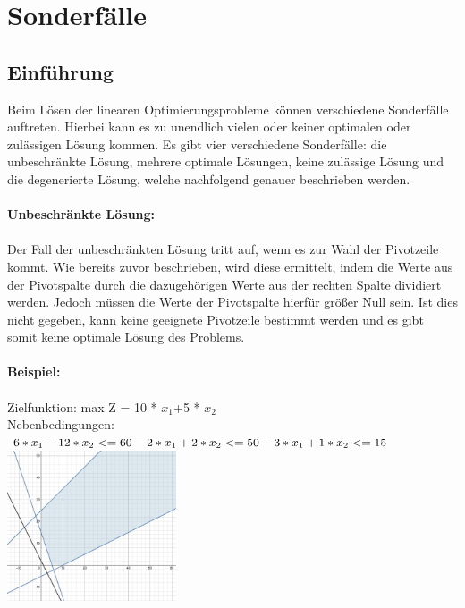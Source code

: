 \section{Sonderfälle}
\subsection{Einführung}
Beim Lösen der linearen Optimierungsprobleme können verschiedene Sonderfälle auftreten. Hierbei kann es zu unendlich vielen oder keiner optimalen oder zulässigen Lösung kommen.
Es gibt vier verschiedene Sonderfälle: die unbeschränkte Lösung, mehrere optimale Lösungen, keine zulässige Lösung und die degenerierte Lösung, welche nachfolgend genauer beschrieben werden.\\\\
\textbf{Unbeschränkte Lösung:}\\\\
Der Fall der unbeschränkten Lösung tritt auf, wenn es zur Wahl der Pivotzeile kommt. Wie bereits zuvor beschrieben, wird diese ermittelt, indem die Werte aus der Pivotspalte durch die dazugehörigen Werte aus der rechten Spalte dividiert werden. Jedoch müssen die Werte der Pivotspalte hierfür größer Null sein. Ist dies nicht gegeben, kann keine geeignete Pivotzeile bestimmt werden und es gibt somit keine optimale Lösung des Problems.
\\\\
\textbf{Beispiel:}\\\\
Zielfunktion: max Z = 10 * $x_1$+5 * $x_2$\\
Nebenbedingungen:\\\begin{math}
6*x_1-12*x_2 <= 60\\
-2*x_1+2*x_2 <= 50\\
-3*x_1 +1*x_2 <= 15\\\end{math}
\includegraphics[width=5cm,right]{images/IMG_unbeschrankte_Losung.jpeg}
\\\\
